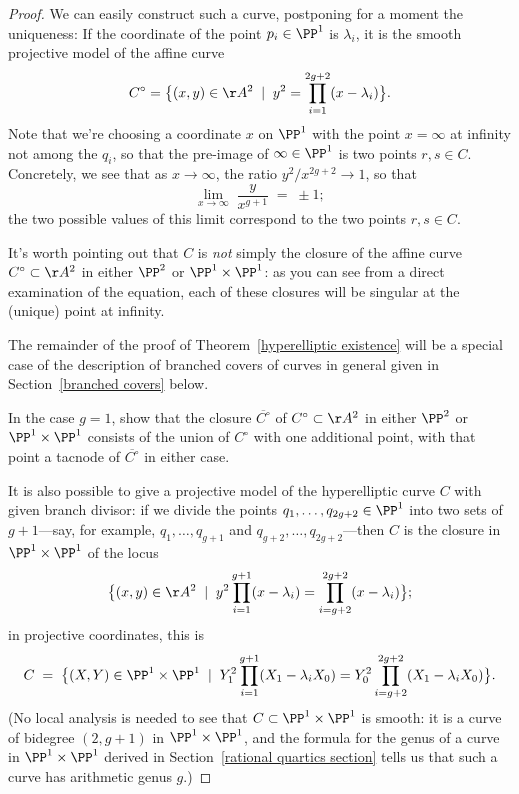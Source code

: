 \begin{proof} 
We can easily construct such a curve, postponing for a moment the uniqueness:
If the coordinate of the point $p_i \in \PP^1$ is $\lambda_i$, it is the smooth projective model of the affine curve 
  $$
C^\circ = \big\{ (x,y) \in \AA^2 \; \mid \; y^2 = \prod_{i=1}^{2g+2} (x - \lambda_i) \big\}.
$$ 
Note that we're choosing a coordinate $x$ on $\PP^1$ with the point $x = \infty$ at infinity not among the $q_i$, so that the pre-image of $\infty \in \PP^1$ is two points $r, s \in C$. Concretely, we see that as $x \to \infty$, the ratio $y^2/x^{2g+2} \to 1$, so that 
$$
\lim_{x \to \infty} \; \frac{y}{x^{g+1}} \; = \; \pm 1;
$$
  the two possible values of this limit correspond to the two points $r,s \in C$.
  
  It's worth pointing out that $C$ is \emph{not} simply the closure of the affine curve $C^\circ \subset \AA^2$ in either $\PP^2$ or $\PP^1 \times \PP^1$: as you can see from a direct examination of the equation, each of these closures will be singular at the (unique) point at infinity.
  
   The remainder of the proof of Theorem~\ref{hyperelliptic existence} will be a special case of the  description of branched covers of curves in general given in Section~\ref{branched covers} below.
   
 \begin{exercise}
  In the case $g=1$, show that the closure $\overline{C^\circ}$ of $C^\circ \subset \AA^2$ in either $\PP^2$ or $\PP^1 \times \PP^1$ consists of the union of $C^\circ$ with one additional point, with that point a tacnode of $\overline{C^\circ}$ in either case.
  \end{exercise}
  
It is also possible to give a projective model of the hyperelliptic curve $C$ with given branch divisor: if we divide the points $q_1,\dots,q_{2g+2} \in \PP^1$ into two sets of $g+1$---say, for example, $q_1,\dots,q_{g+1}$ and $q_{g+2}, \dots, q_{2g+2}$---then $C$ is the closure in $\PP^1 \times \PP^1$ of the  locus
  $$
  \big\{ (x,y) \in \AA^2 \; \mid \; y^2\prod_{i=1}^{g+1} (x - \lambda_i) = \prod_{i=g+2}^{2g+2} (x - \lambda_i) \big\};
  $$
  in projective coordinates, this is
   $$
  C \; = \; \big\{ (X,Y) \in \PP^1 \times \PP^1 \; \mid \; Y_1^2\prod_{i=1}^{g+1} (X_1 - \lambda_iX_0) = Y_0^2\prod_{i=g+2}^{2g+2} (X_1 - \lambda_iX_0) \big\}.
  $$
  (No local analysis is needed to see that $C \subset \PP^1 \times \PP^1$ is smooth: it is a curve of bidegree $(2,g+1)$ in $\PP^1 \times \PP^1$, and the formula for the genus of a curve in $\PP^1 \times \PP^1$ derived in Section~\ref{rational quartics section} tells us that such a curve has arithmetic genus $g$.)
  

\end{proof}
